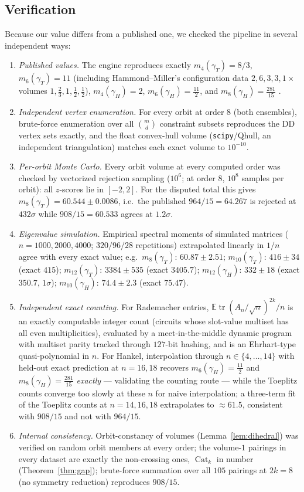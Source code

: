 ﻿\documentclass[11pt]{article}
\theoremstyle{remark}
\newcommand{\E}{\mathbb{E}}
\newcommand{\Cat}{\operatorname{Cat}}
\newcommand{\gT}{\gamma_T}
\newcommand{\gH}{\gamma_H}
\begin{document}
\subsection{Verification}\label{sec:verification}
Because our value differs from a published one, we checked the pipeline in several
independent ways:
\begin{enumerate}
\item \emph{Published values.} The engine reproduces exactly $m_4(\gT)=8/3$,
$m_6(\gT)=11$ (including Hammond--Miller's configuration data
$2,6,3,3,1\times$ volumes $1,\tfrac23,1,\tfrac12,\tfrac12$), $m_4(\gH)=2$,
$m_6(\gH)=\tfrac{11}{2}$, and $m_8(\gH)=\tfrac{281}{15}$ \cite{BDJ,HM}.
\item \emph{Independent vertex enumeration.} For every orbit at order $8$ (both
ensembles), brute-force enumeration over all $\binom{m}{d}$ constraint subsets
reproduces the DD vertex sets exactly, and the float convex-hull volume
(\texttt{scipy}/Qhull, an independent triangulation) matches each exact volume to
$10^{-10}$.
\item \emph{Per-orbit Monte Carlo.} Every orbit volume at every computed order was
checked by vectorized rejection sampling ($10^6$; at order $8$, $10^8$ samples per
orbit): all $z$-scores lie in $[-2,2]$. For the disputed total this gives
$m_8(\gT)=60.544\pm0.0086$, i.e.\ the published $964/15=64.267$ is rejected at
$432\sigma$ while $908/15=60.533$ agrees at $1.2\sigma$.
\item \emph{Eigenvalue simulation.} Empirical spectral moments of simulated matrices
($n=1000,2000,4000$; $320/96/28$ repetitions) extrapolated linearly in $1/n$ agree with
every exact value; e.g.\ $m_8(\gT)$: $60.87\pm2.51$; $m_{10}(\gT)$: $416\pm34$ (exact
$415$); $m_{12}(\gT)$: $3384\pm535$ (exact $3405.7$); $m_{12}(\gH)$: $332\pm18$ (exact
$350.7$, $1\sigma$); $m_{10}(\gH)$: $74.4\pm2.3$ (exact $75.47$).
\item \emph{Independent exact counting.} For Rademacher entries,
$\E\operatorname{tr}(A_n/\sqrt n)^{2k}/n$ is an exactly computable integer count
(circuits whose slot-value multiset has all even multiplicities), evaluated by a
meet-in-the-middle dynamic program with multiset parity tracked through $127$-bit
hashing, and is an Ehrhart-type quasi-polynomial in $n$. For Hankel, interpolation
through $n\in\{4,\dots,14\}$ with held-out exact prediction at $n=16,18$ recovers
$m_6(\gH)=\tfrac{11}2$ and $m_8(\gH)=\tfrac{281}{15}$ \emph{exactly} --- validating the
counting route --- while the Toeplitz counts converge too slowly at these $n$ for naive
interpolation; a three-term fit of the Toeplitz counts at $n=14,16,18$ extrapolates
to $\approx61.5$, consistent with $908/15$ and not with $964/15$.
\item \emph{Internal consistency.} Orbit-constancy of volumes (Lemma~\ref{lem:dihedral})
was verified on random orbit members at every order; the volume-$1$ pairings in every
dataset are exactly the non-crossing ones, $\Cat_k$ in number
(Theorem~\ref{thm:gap}); brute-force summation over all $105$ pairings at $2k=8$
(no symmetry reduction) reproduces $908/15$.
\end{enumerate}
\end{document}
